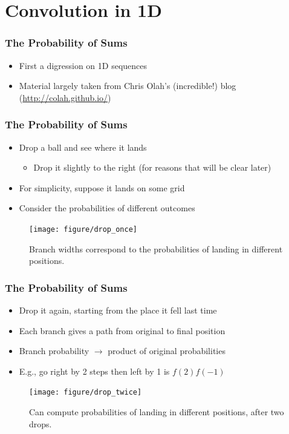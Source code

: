 \documentclass[10pt,mathserif]{beamer}
\begin{document}
\section{Convolution in 1D}

\begin{frame}
  \frametitle{The Probability of Sums}
  \begin{itemize}
  \item First a digression on 1D sequences
  \item Material largely taken from Chris Olah's (incredible!) blog
    (\url{http://colah.github.io/})
  \end{itemize}
\end{frame}

\begin{frame}
  \frametitle{The Probability of Sums}
  \begin{itemize}
  \item Drop a ball and see where it lands
    \begin{itemize}
    \item Drop it slightly to the right (for reasons that will be clear later)
    \end{itemize}
  \item For simplicity, suppose it lands on some grid
  \item Consider the probabilities of different outcomes
  \end{itemize}
\begin{figure}[ht]
  \centering
  \texttt{[image: figure/drop\_once]}
  \caption{Branch widths correspond to the probabilities of landing in different
    positions. \label{fig:drop_once} }
\end{figure}
\end{frame}

\begin{frame}
  \frametitle{The Probability of Sums}
  \begin{itemize}
    \item Drop it again, starting from the place it fell last time
    \item Each branch gives a path from original to final position
    \item Branch probability $\rightarrow$ product of original probabilities
    \item E.g., go right by 2 steps then left by 1 is $f\left(2\right)f\left(-1\right)$
  \end{itemize}
  \begin{figure}[ht]
    \centering
    \texttt{[image: figure/drop\_twice]}
    \caption{Can compute probabilities of landing in different positions, after
      two drops.
       \label{fig:drop_twice_probs}}
  \end{figure}
\end{frame}
\end{document}
